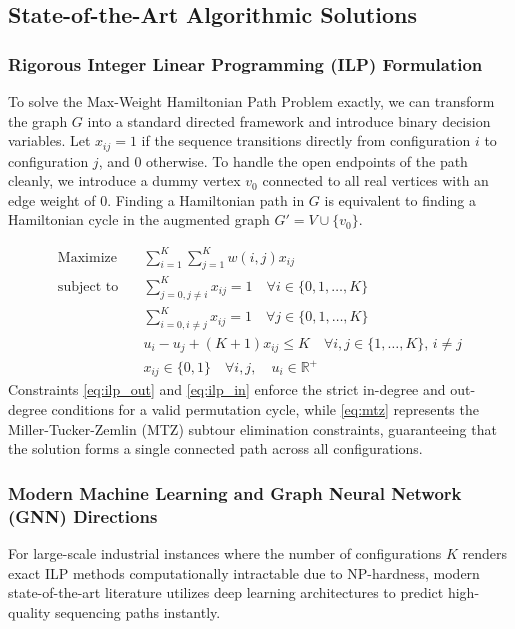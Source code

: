 \documentclass[11pt,a4paper]{article}
\theoremstyle{plain}
\theoremstyle{definition}
\begin{document}
\subsection{State-of-the-Art Algorithmic Solutions}

\subsubsection{Rigorous Integer Linear Programming (ILP) Formulation}
To solve the Max-Weight Hamiltonian Path Problem exactly, we can transform the graph $G$ into a standard directed framework and introduce binary decision variables. Let $x_{ij} = 1$ if the sequence transitions directly from configuration $i$ to configuration $j$, and 0 otherwise. To handle the open endpoints of the path cleanly, we introduce a dummy vertex $v_0$ connected to all real vertices with an edge weight of 0. Finding a Hamiltonian path in $G$ is equivalent to finding a Hamiltonian cycle in the augmented graph $G' = V \cup \{v_0\}$.

\begin{align}
	\text{Maximize} \quad & \sum_{i=1}^{K} \sum_{j=1}^{K} w(i, j) x_{ij} \\
	\text{subject to} \quad & \sum_{j=0, j \neq i}^{K} x_{ij} = 1 \quad \forall i \in \{0, 1, \dots, K\} \label{eq:ilp_out} \\
	& \sum_{i=0, i \neq j}^{K} x_{ij} = 1 \quad \forall j \in \{0, 1, \dots, K\} \label{eq:ilp_in} \\
	& u_i - u_j + (K+1)x_{ij} \le K \quad \forall i, j \in \{1, \dots, K\}, \, i \neq j \label{eq:mtz} \\
	& x_{ij} \in \{0, 1\} \quad \forall i, j, \quad u_i \in \mathbb{R}^+
\end{align}
Constraints \eqref{eq:ilp_out} and \eqref{eq:ilp_in} enforce the strict in-degree and out-degree conditions for a valid permutation cycle, while \eqref{eq:mtz} represents the Miller-Tucker-Zemlin (MTZ) subtour elimination constraints, guaranteeing that the solution forms a single connected path across all configurations.

\subsubsection{Modern Machine Learning and Graph Neural Network (GNN) Directions}
For large-scale industrial instances where the number of configurations $K$ renders exact ILP methods computationally intractable due to NP-hardness, modern state-of-the-art literature utilizes deep learning architectures to predict high-quality sequencing paths instantly.
\end{document}
